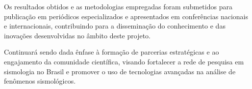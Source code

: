 \par{Os resultados obtidos e as metodologias empregadas foram submetidos para publicação em periódicos especializados e apresentados em conferências nacionais e internacionais, contribuindo para a disseminação do conhecimento e das inovações desenvolvidas no âmbito deste projeto.}

\par{Continuará sendo dada ênfase à formação de parcerias estratégicas e ao engajamento da comunidade científica, visando fortalecer a rede de pesquisa em sismologia no Brasil e promover o uso de tecnologias avançadas na análise de fenômenos sismológicos.}

